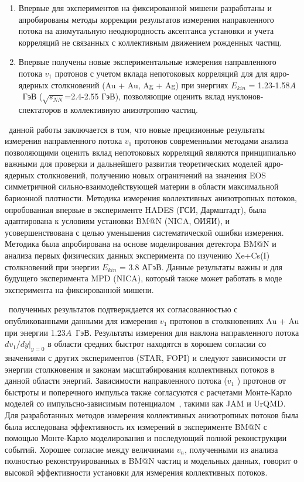 \novelty
\begin{enumerate}
    \item Впервые для экспериментов на фиксированной мишени разработаны и апробированы методы коррекции результатов измерения направленного потока на азимутальную неоднородность аксептанса установки и учета корреляций не связанных с  коллективным движением рожденных частиц.

    \item Впервые получены новые экспериментальные измерения направленного потока $v_1$ протонов с учетом вклада непотоковых корреляций для для ядро-ядерных столкновений (Au + Au, Ag + Ag) при энергиях $E_{kin}$ = 1.23-1.58$A$~ГэВ ($\sqrt{s_{NN}}$=2.4-2.55 ГэВ), позволяющие оценить вклад нуклонов-спектаторов в коллективную анизотропию частиц.
\end{enumerate}
\influence\ данной работы заключается в том, что новые прецизионные результаты измерения направленного потока $v_1$ протонов современными методами анализа позволяющими оценить вклад непотоковых корреляций являются принципиально важными для проверки и дальнейшего развития теоретических моделей ядро-ядерных столкновений, получению новых ограничений на значения EOS симметричной сильно-взаимодействующей материи в области максимальной барионной плотности.
Методика измерения коллективных анизотропных потоков, опробованная впервые в эксперименте HADES (ГСИ, Дармштадт), была адаптирована к условиям установки BM@N (NICA, ОИЯИ), и усовершенствована с целью уменьшения систематической ошибки измерения. Методика была апробирована на основе моделирования детектора BM@N и анализа первых физических данных эксперимента по изучению Xe+Cs(I) столкновений при энергии $E_{kin}$ = 3.8 АГэВ.  Данные результаты важны и  для будущего эксперимента MPD (NICA), 
который также может работать в моде эксперимента на фиксированной мишени.

\reliability\ полученных результатов подтверждается их согласованностью с опубликованными данными для измерения  $v_1$ протонов в столкновениях Au + Au при энергии 1.23$A$~ГэВ. Результаты измерения для наклона направленного потока $dv_1/dy|_{y=0}$ в области средних быстрот находятся в хорошем согласии со значениями с других экспериментов (STAR, FOPI)  и следуют зависимости от энергии столкновения и законам масштабирования коллективных потоков в данной области энергий.
Зависимости направленного потока ($v_1$ ) протонов от быстроты и поперечного импульса также согласуются с расчетами Монте-Карло моделей со импульсно-зависимым потенциалом~\cite{nara2019jam}, такими как JAM и UrQMD.
Для разработанных методов измерения коллективных анизотропных потоков была была исследована эффективность их измерений в эксперименте BM@N с помощью Монте-Карло моделирования и последующий полной реконструкции событий.
Хорошее согласие между величинами  $v_n$,  полученными из анализа полностью реконструированных в BM@N частиц  и модельных данных, говорит о высокой эффективности установки для измерения коллективных потоков.\\


